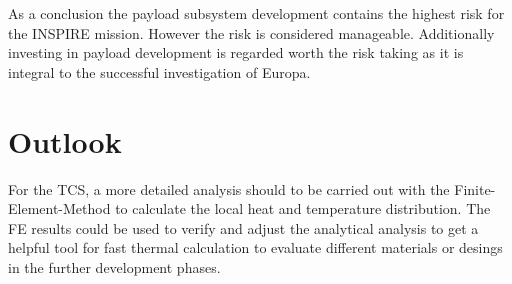 As a conclusion the payload subsystem development contains the highest risk for the INSPIRE mission. However the risk is considered manageable. Additionally investing in payload development is regarded worth the risk taking as it is integral to the successful investigation of Europa.

\section{Outlook}
\label{sec:Outlook}



For the TCS, a more detailed analysis should to be carried out with the Finite-Element-Method to calculate the local heat and temperature distribution.
The FE results could be used to verify and adjust the analytical analysis to get a helpful tool for fast thermal calculation to evaluate different materials or desings in the further development phases.

\clearpage